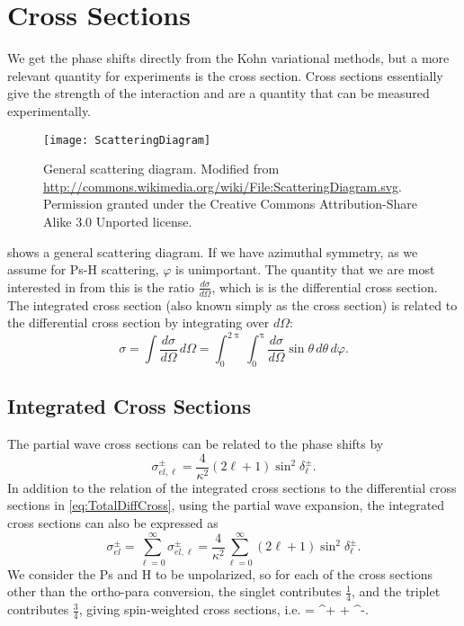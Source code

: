 \documentclass[Dissertation.tex]{subfiles}
\begin{document}
\clearpage
\pagebreak
\newpage

\chapter{Cross Sections}
\label{chp:CrossSections}

We get the phase shifts directly from the Kohn variational methods, but a 
more relevant quantity for experiments is the cross section. Cross sections 
essentially give the strength of the interaction and are a quantity that can 
be measured experimentally.

\begin{figure}[H]
	\centering
	\texttt{[image: ScatteringDiagram]}
	\caption[General scattering diagram]{General scattering diagram. Modified from \url{http://commons.wikimedia.org/wiki/File:ScatteringDiagram.svg}. Permission granted under the Creative Commons Attribution-Share Alike 3.0 Unported license.}
	\label{fig:ScatteringDiagram}
\end{figure}

 shows a general scattering diagram. If we have
azimuthal symmetry, as we assume for Ps-H scattering, $\varphi$ is unimportant.
The quantity that we are most interested in from this is the ratio
$\frac{d\sigma}{d\Omega}$, which is is the differential cross section.
The integrated cross section (also known simply as the cross section) is
related to the differential cross section by integrating over $d\Omega$:
\begin{equation}
\label{eq:TotalDiffCross}
\sigma = \int \frac{d\sigma}{d\Omega} \, d\Omega
 = \int_0^{2\uppi} \int_0^{\uppi} \frac{d\sigma}{d\Omega} \sin\theta \, d\theta \, d\varphi.
\end{equation}


\section{Integrated Cross Sections}
\label{sec:totalcross}

The partial wave cross sections can be 
related to the phase shifts by
\citep[p.584]{Bransden2003}
\begin{equation}
\label{eq:PartialCross}
\sigma_{el,\ell}^\pm = \frac{4}{\kappa^2} (2\ell+1) \sin^2 \delta_\ell^\pm.
\end{equation}
In addition to the relation of the integrated cross sections to the
differential cross sections in \cref{eq:TotalDiffCross},
using the partial wave expansion, the integrated cross sections can also be 
expressed as \citep[p.]{Bransden2003}
\begin{equation}
\label{eq:TotalCross}
\sigma_{el}^\pm = \sum_{\ell=0}^\infty \sigma_{el,\ell}^\pm = \frac{4}{\kappa^2} \sum_{\ell=0}^\infty (2\ell+1) \sin^2 \delta_\ell^\pm.
\end{equation}
We consider the Ps and H to be unpolarized, so
for each of the cross sections other than the ortho-para conversion, the 
singlet contributes $\frac{1}{4}$, and the triplet contributes $\frac{3}{4}$, 
giving spin-weighted cross sections, i.e. \cite{Ward1987,Blackwood2002}
\beq
\label{eq:SpinWeightCS}
\sigma =  \sigma^+ +  \sigma^-.
\eeq
\end{document}
